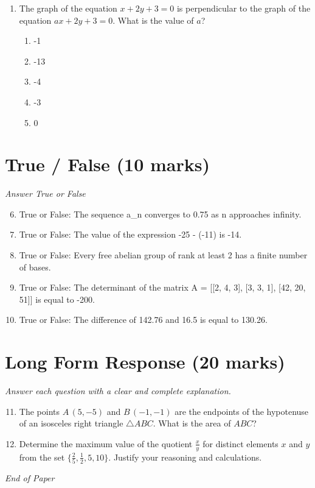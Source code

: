 \documentclass[12pt]{article}
\begin{document}
\begin{enumerate}[label=\arabic*.]
\begin{enumerate}[label=(\alph*)]
    \item \$4.52
    \item \$7.28
    \item \$5.52
    \item \$6.28
    \item \$3.72
\end{enumerate}
\item The graph of the equation $x + 2 y + 3 = 0$ is perpendicular to the graph of the equation $ax + 2 y + 3 = 0$. What is the value of $a$?
\begin{enumerate}[label=(\alph*)]
    \item -1
    \item -13
    \item -4
    \item -3
    \item 0
\end{enumerate}
\end{enumerate}

\section*{True / False (10 marks)}
\textit{Answer True or False}
\begin{enumerate}[label=\arabic*.]
\setcounter{enumi}{5}
\item True or False: The sequence a\_n converges to 0.75 as n approaches infinity.
\item True or False: The value of the expression -25 - (-11) is -14.
\item True or False: Every free abelian group of rank at least 2 has a finite number of bases.
\item True or False: The determinant of the matrix A = [[2, 4, 3], [3, 3, 1], [42, 20, 51]] is equal to -200.
\item True or False: The difference of 142.76 and 16.5 is equal to 130.26.
\end{enumerate}

\section*{Long Form Response (20 marks)}
\textit{Answer each question with a clear and complete explanation.}
\begin{enumerate}[label=\arabic*.]
\setcounter{enumi}{10}
\item The points $A\, (5,-5)$ and $B\, (-1,-1)$ are the endpoints of the hypotenuse of an isosceles right triangle $\triangle ABC$. What is the area of $ABC$?
\item Determine the maximum value of the quotient $\frac{x}{y}$ for distinct elements $x$ and $y$ from the set $\{\frac{2}{5}, \frac{1}{2}, 5, 10\}$. Justify your reasoning and calculations.
\end{enumerate}

\vfill
\noindent\textit{End of Paper}
\end{document}
